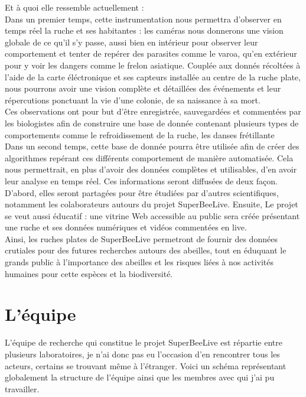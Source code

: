 \documentclass[11pt,french,a4paper]{report}
\begin{document}

Et à quoi elle ressemble actuellement : \\


Dans un premier temps, cette instrumentation nous permettra d'observer en temps réel la ruche et ses habitantes : 
les caméras nous donnerons une vision globale de ce qu'il s'y passe, aussi bien en intérieur pour observer leur 
comportement et tenter de repérer des parasites comme le varoa, qu'en extérieur pour y voir les dangers comme le frelon asiatique. %
Couplée aux donnés récoltées à l'aide de la carte éléctronique et ses capteurs installée au centre de la ruche plate, 
nous pourrons avoir une vision complète et détaillées des événements et leur répercutions ponctuant la vie d'une colonie,
de sa naissance à sa mort. \\
Ces observations ont pour but d'être enregistrée, sauvegardées et commentées par les biologistes afin de construire une base
de donnée contenant plusieurs types de comportements comme le refroidissement de la ruche, les danses frétillante %
\\
Dans un second temps, cette base de donnée pourra être utilisée afin de créer des algorithmes repérant ces différents comportement
de manière automatisée. Cela nous permettrait, en plus d'avoir des données complètes et utilisables, d'en avoir leur analyse en 
temps réel. Ces informations seront diffusées de deux façon. D'abord, elles seront partagées pour être étudiées par d'autres scientifiques, 
notamment les colaborateurs autours du projet SuperBeeLive. Ensuite, Le projet se veut aussi éducatif : une vitrine Web accessible au public 
sera créée présentant une ruche et ses données numériques et vidéos commentées en live. \\

Ainsi, les ruches plates de SuperBeeLive permetront de fournir des données crutiales pour des futures recherches autours des abeilles, tout en 
éduquant le grands public à l'importance des abeilles et les risques liées à nos activités humaines pour cette espèces et la biodiversité. 

\section{L'équipe}
L'équipe de recherche qui constitue le projet SuperBeeLive est répartie entre plusieurs laboratoires, je n'ai donc pas eu l'occasion
d'en rencontrer tous les acteurs, certains se trouvant même à l'étranger. Voici un schéma représentant globalement la structure
de l'équipe ainsi que les membres avec qui j'ai pu travailler. \\
\end{document}
